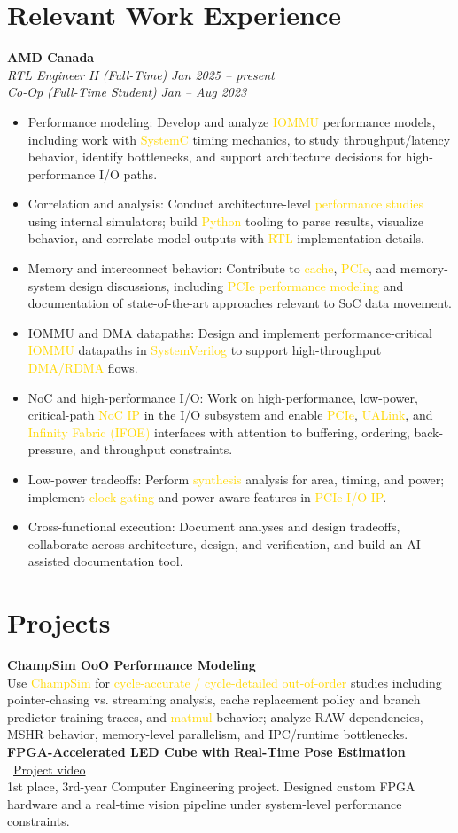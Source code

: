 \documentclass[11pt]{article}
\newcommand{\gold}[1]{\textcolor{gold}{#1}}
\newcommand{\resumeItem}[1]{\item\small{#1}}
\begin{document}
\section{Relevant Work Experience}
\textbf{AMD Canada}\\
\textit{RTL Engineer II (Full-Time)} \hfill \textit{Jan 2025 -- present}\\
\textit{Co-Op (Full-Time Student)} \hfill \textit{Jan -- Aug 2023}
\begin{itemize}[leftmargin=*]
  \resumeItem{Performance modeling: Develop and analyze \gold{IOMMU} performance models, including work with \gold{SystemC} timing mechanics, to study throughput/latency behavior, identify bottlenecks, and support architecture decisions for high-performance I/O paths.}
  \resumeItem{Correlation and analysis: Conduct architecture-level \gold{performance studies} using internal simulators; build \gold{Python} tooling to parse results, visualize behavior, and correlate model outputs with \gold{RTL} implementation details.}
  \resumeItem{Memory and interconnect behavior: Contribute to \gold{cache}, \gold{PCIe}, and memory-system design discussions, including \gold{PCIe performance modeling} and documentation of state-of-the-art approaches relevant to SoC data movement.}
  \resumeItem{IOMMU and DMA datapaths: Design and implement performance-critical \gold{IOMMU} datapaths in \gold{SystemVerilog} to support high-throughput \gold{DMA/RDMA} flows.}
  \resumeItem{NoC and high-performance I/O: Work on high-performance, low-power, critical-path \gold{NoC IP} in the I/O subsystem and enable \gold{PCIe}, \gold{UALink}, and \gold{Infinity Fabric (IFOE)} interfaces with attention to buffering, ordering, back-pressure, and throughput constraints.}
  \resumeItem{Low-power tradeoffs: Perform \gold{synthesis} analysis for area, timing, and power; implement \gold{clock-gating} and power-aware features in \gold{PCIe I/O IP}.}
  \resumeItem{Cross-functional execution: Document analyses and design tradeoffs, collaborate across architecture, design, and verification, and build an AI-assisted documentation tool.}
\end{itemize}

\section{Projects}
\textbf{ChampSim OoO Performance Modeling}\\
Use \gold{ChampSim} for \gold{cycle-accurate / cycle-detailed out-of-order} studies including pointer-chasing vs. streaming analysis, cache replacement policy and branch predictor training traces, and \gold{matmul} behavior; analyze RAW dependencies, MSHR behavior, memory-level parallelism, and IPC/runtime bottlenecks.\\
\textbf{FPGA-Accelerated LED Cube with Real-Time Pose Estimation} \textbar\ \href{https://www.youtube.com/watch?v=kbrSmiwQhu4&ab_channel=AdinMauer}{Project video}\\
1st place, 3rd-year Computer Engineering project. Designed custom FPGA hardware and a real-time vision pipeline under system-level performance constraints.
\end{document}
